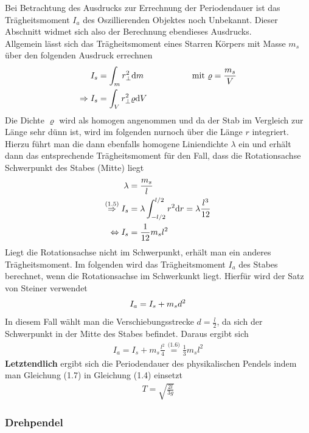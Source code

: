 \documentclass[11pt,a4paper]{article}
\begin{document}
Bei Betrachtung des Ausdrucks zur Errechnung der Periodendauer ist das Trägheitsmoment $I_a$ des Oszillierenden Objektes noch Unbekannt. Dieser Abschnitt widmet sich also der Berechnung ebendieses Ausdrucks.\\

Allgemein lässt sich das Trägheitsmoment eines Starren Körpers mit Masse $m_s$ über den folgenden Ausdruck errechnen
\begin{align}
	I_s &= \int_{m}^{}  r^2_\perp \mathrm{d}m  \hspace{2cm}\text{mit  }  \varrho = \frac{m_s}{V} \notag\\
	\Rightarrow I_s &= \int_{V}^{} r^2_\perp \varrho \mathrm{d}V
\end{align}
Die Dichte $\varrho$ wird als homogen angenommen und da der Stab im Vergleich zur Länge sehr dünn ist, wird im folgenden nurnoch über die Länge $r$ integriert. Hierzu führt man die dann ebenfalls homogene Liniendichte $\lambda$ ein und erhält dann das entsprechende Trägheitsmoment für den Fall, dass die Rotationsachse Schwerpunkt des Stabes (Mitte) liegt
\begin{align}
	\lambda &= \frac{m_s}{l} \notag \\
	\overset{\text{(1.5)}}{\underset{\text{ }}{\Rightarrow}} I_s &= \lambda\int_{-l/2}^{l/2} r^2 \mathrm{d}r = \lambda \frac{l^3}{12}\notag \\
	\Leftrightarrow I_s &= \frac{1}{12} m_s l^2
\end{align}
Liegt die Rotationsachse nicht im Schwerpunkt, erhält man ein anderes Trägheitsmoment. Im folgenden wird das Trägheitsmoment $I_a$ des Stabes berechnet, wenn die Rotationsachse im Schwerkunkt liegt. Hierfür wird der Satz von Steiner verwendet
\begin{align}
	I_a = I_s + m_s d^2 \notag
\end{align}
	In diesem Fall wählt man die Verschiebungsstrecke $d=\frac{l}{2}$, da sich der Schwerpunkt in der Mitte des Stabes befindet. Daraus ergibt sich
\begin{align}
	 I_a = I_s +m_s \frac{l^2}{4}  \overset{\text{(1.6)}}{=} \frac{1}{3} m_s l^2
\end{align}
{\bf Letztendlich} ergibt sich die Periodendauer des physikalischen Pendels indem man Gleichung (1.7) in Gleichung (1.4) einsetzt
\begin{align}
	T = \sqrt{\frac{2l}{3g}}
\end{align}
       \subsubsection{Drehpendel}
\end{document}
